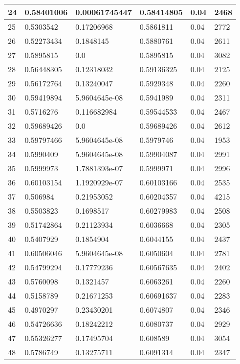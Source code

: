 \begin{longtable}{|l|l|l|l|l|l|}
24 & 0.58401006 & 0.00061745447 & 0.58414805 & 0.04 & 2468 \\ \hline 
25 & 0.5303542 & 0.17206968 & 0.5861811 & 0.04 & 2772 \\ \hline 
26 & 0.52273434 & 0.1848145 & 0.5880761 & 0.04 & 2611 \\ \hline 
27 & 0.5895815 & 0.0 & 0.5895815 & 0.04 & 3082 \\ \hline 
28 & 0.56448305 & 0.12318032 & 0.59136325 & 0.04 & 2125 \\ \hline 
29 & 0.56172764 & 0.13240047 & 0.5929348 & 0.04 & 2260 \\ \hline 
30 & 0.59419894 & 5.9604645e-08 & 0.5941989 & 0.04 & 2311 \\ \hline 
31 & 0.5716276 & 0.116682984 & 0.59544533 & 0.04 & 2467 \\ \hline 
32 & 0.59689426 & 0.0 & 0.59689426 & 0.04 & 2612 \\ \hline 
33 & 0.59797466 & 5.9604645e-08 & 0.5979746 & 0.04 & 1953 \\ \hline 
34 & 0.5990409 & 5.9604645e-08 & 0.59904087 & 0.04 & 2991 \\ \hline 
35 & 0.5999973 & 1.7881393e-07 & 0.5999971 & 0.04 & 2996 \\ \hline 
36 & 0.60103154 & 1.1920929e-07 & 0.60103166 & 0.04 & 2535 \\ \hline 
37 & 0.506984 & 0.21953052 & 0.60204357 & 0.04 & 4215 \\ \hline 
38 & 0.5503823 & 0.1698517 & 0.60279983 & 0.04 & 2508 \\ \hline 
39 & 0.51742864 & 0.21123934 & 0.6036668 & 0.04 & 2305 \\ \hline 
40 & 0.5407929 & 0.1854904 & 0.6044155 & 0.04 & 2437 \\ \hline 
41 & 0.60506046 & 5.9604645e-08 & 0.6050604 & 0.04 & 2781 \\ \hline 
42 & 0.54799294 & 0.17779236 & 0.60567635 & 0.04 & 2402 \\ \hline 
43 & 0.5760098 & 0.1321457 & 0.6063261 & 0.04 & 2260 \\ \hline 
44 & 0.5158789 & 0.21671253 & 0.60691637 & 0.04 & 2283 \\ \hline 
45 & 0.4970297 & 0.23430201 & 0.6074807 & 0.04 & 2346 \\ \hline 
46 & 0.54726636 & 0.18242212 & 0.6080737 & 0.04 & 2929 \\ \hline 
47 & 0.55326277 & 0.17495704 & 0.608589 & 0.04 & 3054 \\ \hline 
48 & 0.5786749 & 0.13275711 & 0.6091314 & 0.04 & 2347 \\ \hline 

\end{longtable}
